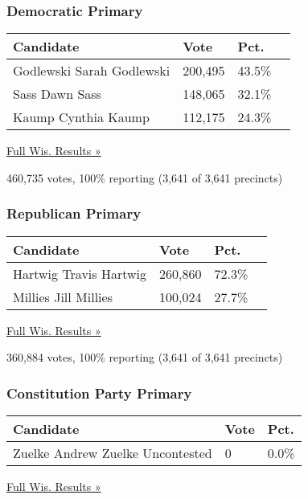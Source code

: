 \hypertarget{democratic-primary-13}{%
\subsubsection{Democratic Primary}\label{democratic-primary-13}}

\begin{longtable}[]{@{}llll@{}}
\toprule
Candidate & Vote & Pct. &\tabularnewline
\midrule
\endhead
 Godlewski Sarah Godlewski & 200,495 & 43.5\% &\tabularnewline
 Sass Dawn Sass & 148,065 & 32.1\% &\tabularnewline
 Kaump Cynthia Kaump & 112,175 & 24.3\% &\tabularnewline
\bottomrule
\end{longtable}

\href{https://www.nytimes3xbfgragh.onion/elections/results/wisconsin}{Full
Wis. Results »}

460,735 votes, 100\% reporting (3,641 of 3,641 precincts)

\hypertarget{republican-primary-12}{%
\subsubsection{Republican Primary}\label{republican-primary-12}}

\begin{longtable}[]{@{}llll@{}}
\toprule
Candidate & Vote & Pct. &\tabularnewline
\midrule
\endhead
 Hartwig Travis Hartwig & 260,860 & 72.3\% &\tabularnewline
 Millies Jill Millies & 100,024 & 27.7\% &\tabularnewline
\bottomrule
\end{longtable}

\href{https://www.nytimes3xbfgragh.onion/elections/results/wisconsin}{Full
Wis. Results »}

360,884 votes, 100\% reporting (3,641 of 3,641 precincts)

\hypertarget{constitution-party-primary-1}{%
\subsubsection{Constitution Party
Primary}\label{constitution-party-primary-1}}

\begin{longtable}[]{@{}lll@{}}
\toprule
Candidate & Vote & Pct.\tabularnewline
\midrule
\endhead
 Zuelke Andrew Zuelke Uncontested & 0 & 0.0\%\tabularnewline
\bottomrule
\end{longtable}

\href{https://www.nytimes3xbfgragh.onion/elections/results/wisconsin}{Full
Wis. Results »}

